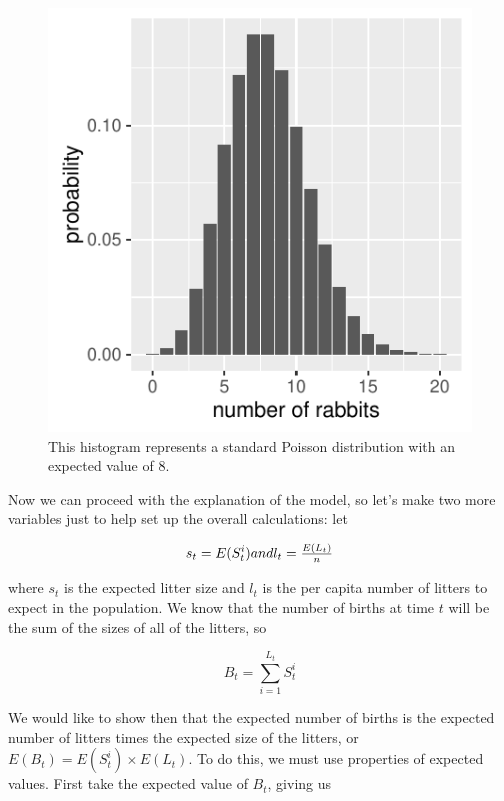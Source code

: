 \documentclass{article}\usepackage[]{graphicx}\usepackage[]{color}
\makeatletter
\def\maxwidth{ %
  \ifdim\Gin@nat@width>\linewidth
    \linewidth
  \else
    \Gin@nat@width
  \fi
}
\newenvironment{knitrout}{}{} %
\makeatother
\begin{document}
\begin{figure}
\begin{knitrout}
\color{fgcolor}

{\centering \includegraphics[width=\maxwidth]{figure/unnamed-chunk-5-1} 

}



\end{knitrout}
\caption{This histogram represents a standard Poisson distribution with an expected value of 8.}
\end{figure}

Now we can proceed with the explanation of the model, so let's make two more variables just to help set up the overall calculations: let 

\begin{equation}
s_t = E(S_t^i)$$ and $$l_t = \frac{E(L_t)}{n}
\end{equation}

\noindent where \(s_t\) is the expected litter size and \(l_t\) is the per capita number of litters to expect in the population. We know that the number of births at time \(t\) will be the sum of the sizes of all of the litters, so 

\begin{equation}
B_t = \sum_{i=1}^{L_t} S_t^i 
\end{equation}

We would like to show then that the expected number of births is the expected number of litters times the expected size of the litters, or \(E(B_t) = E(S_t^i)\times E(L_t)\). To do this, we must use properties of expected values. First take the expected value of \(B_t\), giving us 
\end{document}
